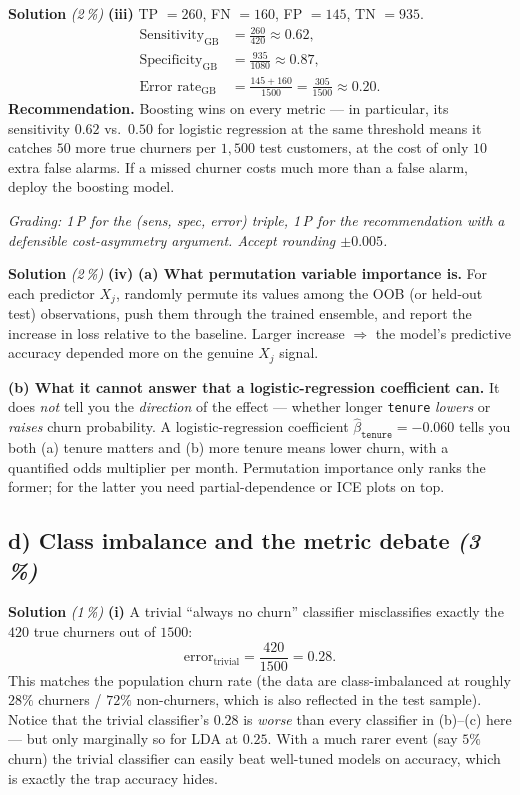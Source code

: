 \documentclass[11pt,a4paper]{article}
\newcommand{\subpoints}[1]{\textit{(#1\,\%)}}
\newcommand{\sol}{\noindent\textbf{Solution}}
\begin{document}
\medskip
\sol{} \subpoints{2} \textbf{(iii)} TP $= 260$, FN $= 160$, FP $= 145$, TN $= 935$.
\begin{align*}
\text{Sensitivity}_{\mathrm{GB}} &= \frac{260}{420} \approx \boxed{0.62}, \\
\text{Specificity}_{\mathrm{GB}} &= \frac{935}{1080} \approx \boxed{0.87}, \\
\text{Error rate}_{\mathrm{GB}} &= \frac{145 + 160}{1500} = \frac{305}{1500} \approx \boxed{0.20}.
\end{align*}
\textbf{Recommendation.} Boosting wins on every metric --- in particular, its sensitivity
$0.62$ vs.\ $0.50$ for logistic regression at the same threshold means it catches $50$ more true
churners per $1{,}500$ test customers, at the cost of only $10$ extra false alarms. If a missed
churner costs much more than a false alarm, deploy the boosting model.

\noindent\emph{Grading: 1\,P for the (sens, spec, error) triple, 1\,P for the recommendation with
a defensible cost-asymmetry argument. Accept rounding $\pm 0.005$.}

\medskip
\sol{} \subpoints{2} \textbf{(iv)} \textbf{(a) What permutation variable importance is.} For each
predictor $X_j$, randomly permute its values among the OOB (or held-out test) observations, push
them through the trained ensemble, and report the increase in loss relative to the baseline. Larger
increase $\Rightarrow$ the model's predictive accuracy depended more on the genuine $X_j$ signal.

\textbf{(b) What it cannot answer that a logistic-regression coefficient can.} It does \emph{not}
tell you the \emph{direction} of the effect --- whether longer \texttt{tenure} \emph{lowers} or
\emph{raises} churn probability. A logistic-regression coefficient
$\hat\beta_{\texttt{tenure}}=-0.060$ tells you both (a) tenure matters and (b) more tenure means
lower churn, with a quantified odds multiplier per month. Permutation importance only ranks the
former; for the latter you need partial-dependence or ICE plots on top.

\subsection*{d) Class imbalance and the metric debate \subpoints{3}}

\sol{} \subpoints{1} \textbf{(i)} A trivial ``always no churn'' classifier misclassifies exactly the
$420$ true churners out of $1500$:
$$\text{error}_{\text{trivial}} = \frac{420}{1500} = \boxed{0.28}.$$
This matches the population churn rate (the data are class-imbalanced at roughly $28\%$
churners / $72\%$ non-churners, which is also reflected in the test sample). Notice that the
trivial classifier's $0.28$ is \emph{worse} than every classifier in (b)--(c) here --- but only
marginally so for LDA at $0.25$. With a much rarer event (say $5\%$ churn) the trivial classifier
can easily beat well-tuned models on accuracy, which is exactly the trap accuracy hides.
\end{document}
